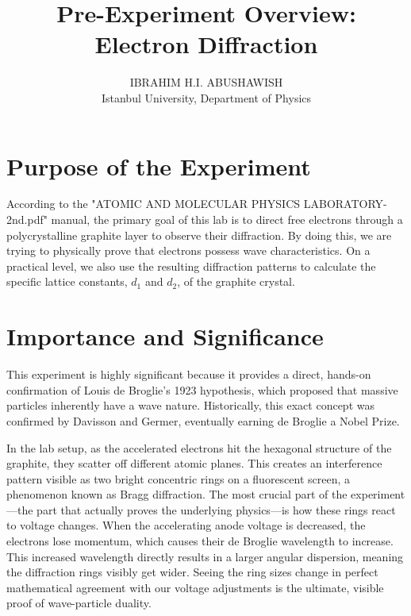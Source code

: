 \documentclass[11pt,a4paper]{article}
\title{\textbf{Pre-Experiment Overview:\\ Electron Diffraction}}
\author{IBRAHIM H.I. ABUSHAWISH \\ Istanbul University, Department of Physics}
\date{}
\begin{document}
\maketitle

\section*{Purpose of the Experiment}
According to the "ATOMIC AND MOLECULAR PHYSICS LABORATORY-2nd.pdf" manual, the primary goal of this lab is to direct free electrons through a polycrystalline graphite layer to observe their diffraction. By doing this, we are trying to physically prove that electrons possess wave characteristics. On a practical level, we also use the resulting diffraction patterns to calculate the specific lattice constants, $d_1$ and $d_2$, of the graphite crystal.

\section*{Importance and Significance}
This experiment is highly significant because it provides a direct, hands-on confirmation of Louis de Broglie's 1923 hypothesis, which proposed that massive particles inherently have a wave nature. Historically, this exact concept was confirmed by Davisson and Germer, eventually earning de Broglie a Nobel Prize.

In the lab setup, as the accelerated electrons hit the hexagonal structure of the graphite, they scatter off different atomic planes. This creates an interference pattern visible as two bright concentric rings on a fluorescent screen, a phenomenon known as Bragg diffraction. The most crucial part of the experiment---the part that actually proves the underlying physics---is how these rings react to voltage changes. When the accelerating anode voltage is decreased, the electrons lose momentum, which causes their de Broglie wavelength to increase. This increased wavelength directly results in a larger angular dispersion, meaning the diffraction rings visibly get wider. Seeing the ring sizes change in perfect mathematical agreement with our voltage adjustments is the ultimate, visible proof of wave-particle duality.
\end{document}
